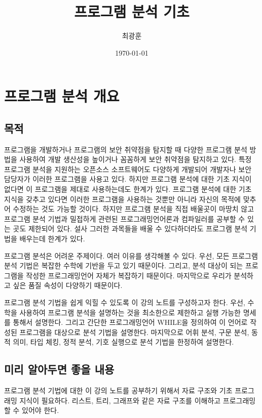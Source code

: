 \documentclass[a4paper]{book}
\title{프로그램 분석 기초}
\author{최광훈}
\date{\today}
\begin{document}
\maketitle

\tableofcontents

\chapter{프로그램 분석 개요}

\section{목적}

프로그램을 개발하거나 프로그램의 보안 취약점을 탐지할 때 다양한
프로그램 분석 방법을 사용하여 개발 생산성을 높이거나 꼼꼼하게 보안
취약점을 탐지하고 있다.
%
특정 프로그램 분석을 지원하는 오픈소스 소프트웨어도 다양하게 개발되어
개발자나 보안 담당자가 이러한 프로그램을 사용고 있다. 하지만 프로그램
분석에 대한 기초 지식이 없다면 이 프로그램을 제대로 사용하는데도
한계가 있다. 프로그램 분석에 대한 기초 지식을 갖추고 있다면 이러한
프로그램을 사용하는 것뿐만 아니라 자신의 목적에 맞추어 수정하는 것도
가능할 것이다.
%
하지만 프로그램 분석을 직접 배울곳이 마땅치 않고 프로그램 분석 기법과
밀접하게 관련된 프로그래밍언어론과 컴파일러를 공부할 수 있는 곳도
제한되어 있다. 설사 그러한 과목들을 배울 수 있다하더라도 프로그램 분석
기법을 배우는데 한계가 있다.

프로그램 분석은 어려운 주제이다. 여러 이유를 생각해볼 수 있다. 우선,
모든 프로그램 분석 기법은 복잡한 수학에 기반을 두고 있기
때문이다. 그리고, 분석 대상이 되는 프로그램을 작성한 프로그래밍언어
자체가 복잡하기 때문이다. 마지막으로 우리가 분석하고 싶은 품질 속성이
다양하기 때문이다.

프로그램 분석 기법을 쉽게 익힐 수 있도록 이 강의 노트를 구성하고자
한다. 우선, 수학을 사용하여 프로그램 분석을 설명하는 것을 최소한으로
제한하고 실행 가능한 명세를 통해서 설명한다. 그리고 간단한
프로그래밍언어 WHILE을 정의하여 이 언어로 작성된 프로그램을 대상으로
분석 기법을 설명한다. 마지막으로 어휘 분석, 구문 분석, 동적 의미, 타입
체킹, 정적 분석, 기호 실행으로 분석 기법을 한정하여 설명한다.

\section{미리 알아두면 좋을 내용}

프로그램 분석 기법에 대한 이 강의 노트를 공부하기 위해서 자료 구조와
기초 프로그래밍 지식이 필요하다. 리스트, 트리, 그래프와 같은 자료
구조를 이해하고 프로그래밍할 수 있어야 한다.
\end{document}
